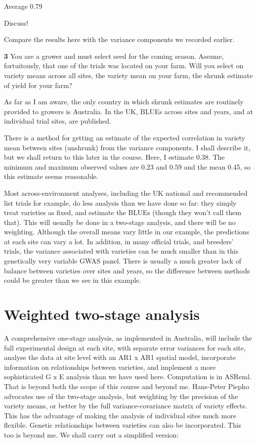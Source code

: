 \documentclass[
]{book}
\makeatletter
\newenvironment{kframe}{%
\medskip{}
\setlength{\fboxsep}{.8em}
 \def\at@end@of@kframe{}%
 \ifinner\ifhmode%
  \def\at@end@of@kframe{\end{minipage}}%
  \begin{minipage}{\columnwidth}%
 \fi\fi%
 \def\FrameCommand##1{\hskip\@totalleftmargin \hskip-\fboxsep
 \colorbox{shadecolor}{##1}\hskip-\fboxsep
     \hskip-\linewidth \hskip-\@totalleftmargin \hskip\columnwidth}%
 \MakeFramed {\advance\hsize-\width
   \@totalleftmargin\z@ \linewidth\hsize
   \@setminipage}}%
 {\par\unskip\endMakeFramed%
 \at@end@of@kframe}
\newenvironment{rmdblock}[1]
  {
  \begin{itemize}
  \renewcommand{\labelitemi}{
    \raisebox{-.7\height}[0pt][0pt]{
      {\setkeys{Gin}{width=3em,keepaspectratio}\texttt{[image: images/\#1]}}
    }
  }
  \setlength{\fboxsep}{1em}
  \begin{kframe}
  \item
  }
  {
  \end{kframe}
  \end{itemize}
  }
\newenvironment{rmdquiz}
  {\begin{rmdblock}{quiz}}
  {\end{rmdblock}}
\makeatother
\begin{document}
Average 0.79

Discuss!

Compare the results here with the variance components we recorded earlier.

\begin{rmdquiz}
\textbf{3} You are a grower and must select seed for the coming season. Assume, fortuitously, that one of the trials was located on your farm. Will you select on variety means across all sites, the variety mean on your farm, the shrunk estimate of yield for your farm?
\end{rmdquiz}

As far as I am aware, the only country in which shrunk estimates are routinely provided to growers is Australia. In the UK, BLUEs across sites and years, and at individual trial sites, are published.

There is a method for getting an estimate of the expected correlation in variety mean between sites (unshrunk) from the variance components. I shall describe it, but we shall return to this later in the course. Here, I estimate 0.38. The minimum and maximum observed values are 0.23 and 0.59 and the mean 0.45, so this estimate seems reasonable.

Most across-environment analyses, including the UK national and recommended list trials for example, do less analysis than we have done so far: they simply treat varieties as fixed, and estimate the BLUEs (though they won't call them that). This will usually be done in a two-stage analysis, and there will be no weighting. Although the overall means vary little in our example, the predictions at each site can vary a lot. In addition, in many official trials, and breeders' trials, the variance associated with varieties can be much smaller than in this genetically very variable GWAS panel. There is usually a much greater lack of balance between varieties over sites and years, so the difference between methods could be greater than we see in this example.

\hypertarget{weighted-two-stage-analysis}{%
\section{Weighted two-stage analysis}\label{weighted-two-stage-analysis}}

A comprehensive one-stage analysis, as implemented in Australia, will include the full experimental design at each site, with separate error variances for each site, analyse the data at site level with an AR1 x AR1 spatial model, incorporate information on relationships between varieties, and implement a more sophisticated G x E analysis than we have used here. Computation is in ASReml. That is beyond both the scope of this course and beyond me. Hans-Peter Piepho advocates use of the two-stage analysis, but weighting by the precision of the variety means, or better by the full variance-covariance matrix of variety effects. This has the advantage of making the analysis of individual sites much more flexible. Genetic relationships between varieties can also be incorporated. This too is beyond me. We shall carry out a simplified version:
\end{document}
